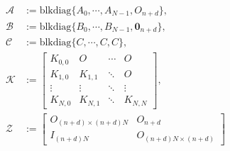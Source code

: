 \documentclass[letterpaper, 10 pt, conference]{ieeeconf}
\newcommand{\A}{\mathcal{A}}
\newcommand{\B}{\mathcal{B}}
\newcommand{\C}{\mathcal{C}}
\newcommand{\blockDiag}{\text{blkdiag}}
\newcommand{\K}{\mathcal{K}}
\newcommand{\Z}{\mathcal{Z}}
\newcommand{\?}{\stackrel{?}{=}}
\newcommand{\paramDim}{d}
\newcommand{\varDim}{n}
\newcommand{\feedbackGain}{K}
\newcommand{\feedbackGainStacked}{\K}
\newcommand{\downshift}{\Z}
\newcommand{\jacobianState}{A}
\newcommand{\jacobianControl}{B}
\newcommand{\jacobianStateStacked}{\A}
\newcommand{\jacobianControlStacked}{\B}
\newcommand{\outputMatrixStacked}{\C}
\newcommand{\iterationHorizon}{N}
\newcommand{\outputMatrix}{C}
\newcommand{\zero}{\textbf{0}}
\begin{document}
{
\setlength{\abovedisplayskip}{1pt}
\setlength{\belowdisplayskip}{3.5pt}
\begin{subequations}
\label{Eqn: Stacking Matrices}
\begin{align}
    \label{Eqn: Stacking State Jacobians}
    \jacobianStateStacked &:= \blockDiag\{ \jacobianState_0, \cdots, \jacobianState_{\iterationHorizon-1}, O_{\varDim + \paramDim} \}, \\
    \label{Eqn: Stacking Control Jacobians}
    \jacobianControlStacked &:= \blockDiag\{ \jacobianControl_0, \cdots, \jacobianControl_{\iterationHorizon-1}, \zero_{\varDim + \paramDim} \}, \\
    \label{Eqn: Stacking Output Matrices}
    \outputMatrixStacked &:= \blockDiag\{ \outputMatrix, \cdots, \outputMatrix, \outputMatrix \}, \\
    \label{Eqn: Stacking Feedback Gains}
    \feedbackGainStacked &:= \begin{bmatrix}
        \feedbackGain_{0, 0} & O & \cdots & O \\[-7pt]
        \feedbackGain_{1, 0} & \feedbackGain_{1, 1} & \ddots & O \\[-3pt]
        \vdots & \vdots & \ddots & \vdots \\[-7pt]
        \feedbackGain_{\iterationHorizon, 0} & \feedbackGain_{\iterationHorizon, 1} & \ddots & \feedbackGain_{\iterationHorizon, \iterationHorizon}
    \end{bmatrix}, \\
    \label{Eqn: Downshift Operator}
    \downshift &:= \begin{bmatrix}
        O_{(\varDim + \paramDim) \times (\varDim + \paramDim)\iterationHorizon} & O_{\varDim + \paramDim} \\
        I_{(\varDim + \paramDim)\iterationHorizon} & O_{(\varDim + \paramDim)\iterationHorizon \times (\varDim + \paramDim)} 
    \end{bmatrix}
\end{align}
\end{subequations}
}
\end{document}
